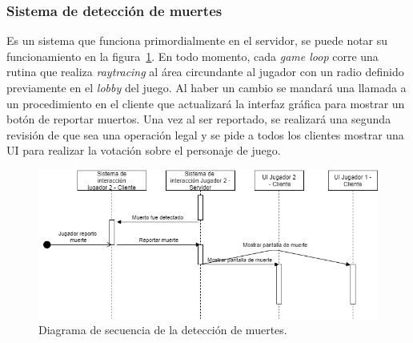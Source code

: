 \subsubsection{Sistema de detección de muertes}
Es un sistema que funciona primordialmente en el servidor, se puede notar su funcionamiento en la figura~\ref{fig:diagrama_sec_detect_muertes}. En todo momento, cada \textit{game loop} corre una rutina que realiza \textit{raytracing} al área circundante al jugador con un radio definido previamente en el \textit{lobby} del juego. Al haber un cambio se mandará una llamada a un procedimiento en el cliente que actualizará la interfaz gráfica para mostrar un botón de reportar muertos. Una vez al ser reportado, se realizará una segunda revisión de que sea una operación legal y se pide a todos los clientes mostrar una UI para realizar la votación sobre el personaje de juego.
\begin{figure}[h!]
    \centering
    \includegraphics[width=1\linewidth]{images/diagrama_deteccion_muerte.png}
    \caption{Diagrama de secuencia de la detección de muertes.}
    \label{fig:diagrama_sec_detect_muertes}
\end{figure}

